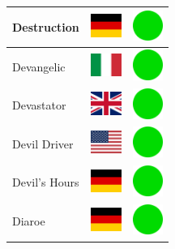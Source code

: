 \documentclass[12pt, a4paper, twoside]{report}
\begin{document}
\begin{center}
\begin{longtable}{|p{5cm}|p{2cm}|p{2cm}|}
 Destruction                                                & \includegraphics[width=1cm]{../4x3/de} &   \includegraphics[width=1cm]{../likes/y} \\ \hline
 Devangelic                                                 & \includegraphics[width=1cm]{../4x3/it} &   \includegraphics[width=1cm]{../likes/y} \\ \hline
 Devastator                                                 & \includegraphics[width=1cm]{../4x3/gb} &   \includegraphics[width=1cm]{../likes/y} \\ \hline
 Devil Driver                                               & \includegraphics[width=1cm]{../4x3/us} &   \includegraphics[width=1cm]{../likes/y} \\ \hline
 Devil's Hours                                              & \includegraphics[width=1cm]{../4x3/de} &   \includegraphics[width=1cm]{../likes/y} \\ \hline
 Diaroe                                                     & \includegraphics[width=1cm]{../4x3/de} &   \includegraphics[width=1cm]{../likes/y} \\ \hline

\end{longtable}
\end{center}
\end{document}
